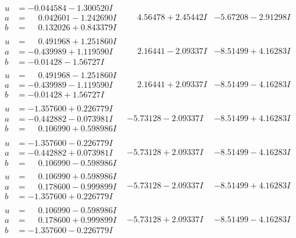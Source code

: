 \documentclass[1p]{elsarticle_modified}
\theoremstyle{definition}
\begin{document}
$$\begin{array}{c|c|c}
\begin{aligned}
u &= -0.044584 - 1.300520 I \\
a &= \phantom{-}0.042601 - 1.242690 I \\
b &= \phantom{-}0.132026 + 0.843379 I\end{aligned}
 & \phantom{-}4.56478 + 2.45442 I & -5.67208 - 2.91298 I \\ \hline\begin{aligned}
u &= \phantom{-}0.491968 + 1.251860 I \\
a &= -0.439989 + 1.119590 I \\
b &= -0.01428 - 1.56727 I\end{aligned}
 & \phantom{-}2.16441 - 2.09337 I & -8.51499 + 4.16283 I \\ \hline\begin{aligned}
u &= \phantom{-}0.491968 - 1.251860 I \\
a &= -0.439989 - 1.119590 I \\
b &= -0.01428 + 1.56727 I\end{aligned}
 & \phantom{-}2.16441 + 2.09337 I & -8.51499 - 4.16283 I \\ \hline\begin{aligned}
u &= -1.357600 + 0.226779 I \\
a &= -0.442882 - 0.073981 I \\
b &= \phantom{-}0.106990 + 0.598986 I\end{aligned}
 & -5.73128 - 2.09337 I & -8.51499 + 4.16283 I \\ \hline\begin{aligned}
u &= -1.357600 - 0.226779 I \\
a &= -0.442882 + 0.073981 I \\
b &= \phantom{-}0.106990 - 0.598986 I\end{aligned}
 & -5.73128 + 2.09337 I & -8.51499 - 4.16283 I \\ \hline\begin{aligned}
u &= \phantom{-}0.106990 + 0.598986 I \\
a &= \phantom{-}0.178600 - 0.999899 I \\
b &= -1.357600 + 0.226779 I\end{aligned}
 & -5.73128 - 2.09337 I & -8.51499 + 4.16283 I \\ \hline\begin{aligned}
u &= \phantom{-}0.106990 - 0.598986 I \\
a &= \phantom{-}0.178600 + 0.999899 I \\
b &= -1.357600 - 0.226779 I\end{aligned}
 & -5.73128 + 2.09337 I & -8.51499 - 4.16283 I \\ \hline\begin{aligned}

\end{aligned}
\end{array}$$
\end{document}
